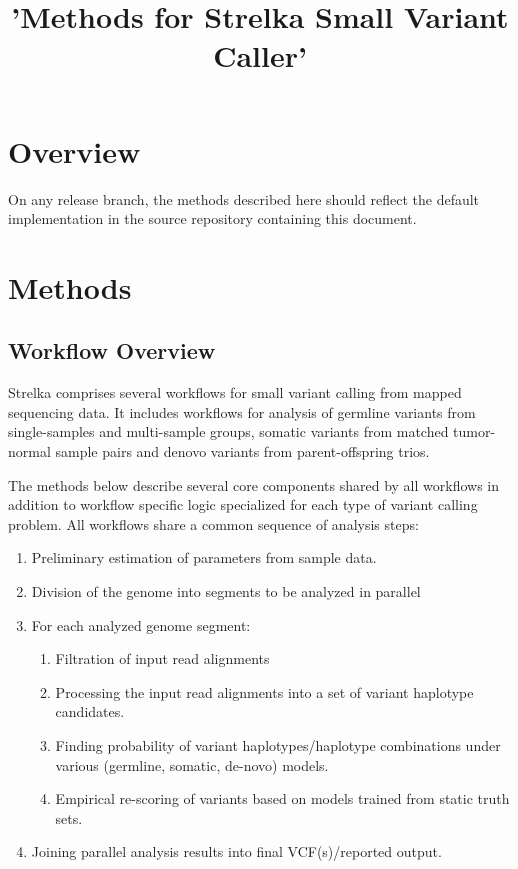 \documentclass{article}
\title{'Methods for Strelka Small Variant Caller'}
\begin{document}
\maketitle

\tableofcontents

\section{Overview}

On any release branch, the methods described here should reflect the default implementation in the source 
repository containing this document.

\section{Methods}

\subsection{Workflow Overview}

Strelka comprises several workflows for small variant calling from mapped sequencing data. It includes workflows for analysis of germline variants from single-samples and multi-sample groups, somatic variants from matched tumor-normal sample pairs and denovo variants from parent-offspring trios.

The methods below describe several core components shared by all workflows in addition to workflow specific logic specialized for each type of variant calling problem. All workflows share a common sequence of analysis steps:

\begin{enumerate}
\item Preliminary estimation of parameters from sample data.
\item Division of the genome into segments to be analyzed in parallel
\item For each analyzed genome segment:
\begin{enumerate}
\item Filtration of input read alignments
\item Processing the input read alignments into a set of variant haplotype candidates.
\item Finding probability of variant haplotypes/haplotype combinations under various (germline, somatic, de-novo) models.
\item Empirical re-scoring of variants based on models trained from static truth sets.
\end{enumerate}
\item Joining parallel analysis results into final VCF(s)/reported output.
\end{enumerate}
\end{document}
